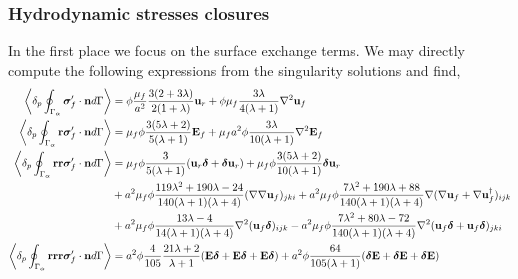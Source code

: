 \subsubsection{Hydrodynamic stresses closures}
In the first place we focus on the surface exchange terms. 
We may directly compute the following expressions from the singularity solutions and find, 
\begin{align}
    \pSavg{\bm\sigma_f'\cdot \textbf{n}} &
    =
    \phi
    \frac{\mu_f}{a^2}
    \frac{3(2+3\lambda)}{2(1+\lambda)}\textbf{u}_r
    + \phi\mu_f  \frac{3\lambda}{4(\lambda +1)} \grad^2 \textbf{u}_f
    \label{eq:drag_forces}
    \\
    \pSavg{\textbf{r}\bm\sigma_f'\cdot \textbf{n}} &
    = \mu_f \phi 
    \frac{3(5\lambda +2)}{5(\lambda +1)}\textbf{E}_f
    + \mu_f a^2 \phi \frac{3\lambda}{10(\lambda+1)}\grad^2  \textbf{E}_f
    \\
    \pSavg{\textbf{rr}\bm\sigma_f'\cdot \textbf{n}} &
    =
    \mu_f \phi \frac{3}{5(\lambda +1)} (\textbf{u}_r \bm\delta + \bm\delta \textbf{u}_r)
    + \mu_f \phi \frac{3(5\lambda +2)}{10(\lambda+1)}\bm\delta \textbf{u}_r\\
    &+ a^2 \mu_f \phi \frac{119\lambda^2+190\lambda-24}{140(\lambda+1)(\lambda+4)}(\grad\grad \textbf{u}_f)_{jki}
    + a^2\mu_f \phi \frac{7\lambda^2+190\lambda+88}{140(\lambda+1)(\lambda+4)}\grad(\grad \textbf{u}_f+\grad \textbf{u}_f^\dagger )_{ijk}\nonumber\\
    &+a^2\mu_f \phi \frac{13\lambda - 4 }{14(\lambda+1)(\lambda+4)}\grad^2 ( \textbf{u}_f\bm\delta)_{ijk}
    - a^2\mu_f \phi \frac{7\lambda^2 + 80 \lambda - 72}{140(\lambda+1)(\lambda+4)}\grad^2(\textbf{u}_f\bm\delta  + \textbf{u}_f \bm\delta)_{jki}\nonumber \\
    \pSavg{\textbf{rrr}\bm\sigma_f'\cdot \textbf{n}} &
    =
    a^2\phi\frac{4}{105}\frac{21\lambda+2}{\lambda+1}
    (\textbf{E}\bm\delta+\textbf{E}\bm\delta + \textbf{E}\bm\delta)
    + 
    a^2\phi \frac{64}{105(\lambda+1)}
    (\bm\delta\textbf{E}+\bm\delta\textbf{E} + \bm\delta\textbf{E})
\end{align}
